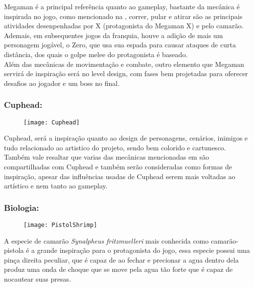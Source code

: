         Megaman é a principal referência quanto ao gameplay, bastante da mecânica é inspirada no jogo, como mencionado na , correr, pular e atirar são as principais atividades desenpenhadas por X (protagonista do Megaman X) e pelo camarão. Ademais, em subsequentes jogos da franquia, houve a adição de mais um personagem jogável, o Zero, que usa sua espada para causar ataques de curta distância, dos quais o golpe melee do protagonista é baseado.\\
        Além das mecânicas de movimentação e combate, outro elemento que Megaman servirá de inspiração será no level design, com fases bem projetadas para oferecer desafios ao jogador e um boss no final.\\

        \subsubsection{Cuphead:}
            \begin{figure}[H]
                \texttt{[image: Cuphead]}
            \centering
            \end{figure}

            Cuphead, será a inspiração quanto ao design de personagens, cenários, inimigos e tudo relacionado ao artistico do projeto, sendo bem colorido e cartunesco.\\
            Também vale resaltar que varias das mecânicas mencionadas em  são compartilhadas com Cuphead e também serão consideradas como formas de inspiração, apesar das influências usadas de Cuphead serem mais voltadas ao artístico e nem tanto ao gameplay.\\

        \subsubsection{Biologia:}
            \begin{figure}[H]
                \texttt{[image: PistolShrimp]}
            \centering
            \end{figure}

            A especie de camarão \textit{Synalpheus fritzmuelleri} mais conhecida como camarão-pistola é a grande inspiração para o protagonista do jogo, essa especie possui uma pinça direita peculiar, que é capaz de ao fechar e precionar a agua dentro dela produz uma onda de choque que se move pela agua tão forte que é capaz de nocautear suas presas.
 
